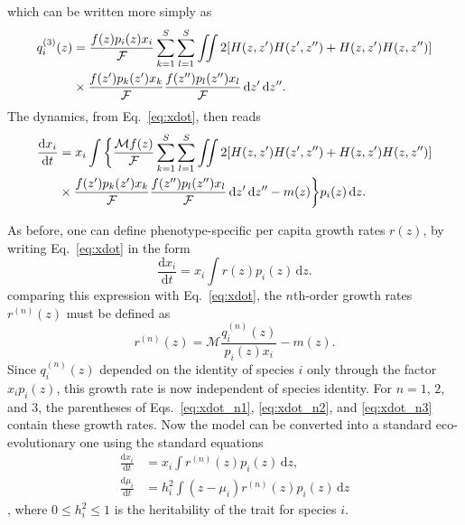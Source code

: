 \documentclass[11pt]{article}
\newcommand{\ud}{\text{d}}
\let\originalleft\left
\let\originalright\right
\renewcommand{\left}{\mathopen{}\mathclose\bgroup\originalleft}
\renewcommand{\right}{\aftergroup\egroup\originalright}
\begin{document}
which can be written more simply as
\begin{equation}
  \label{eq:qiz_n3}
  \begin{split}
    q_i^{(3)}(z) &= \frac{f(z) p_i(z) x_i}{\mathcal{F}} \sum_{k=1}^S \sum_{l=1}^S
    \iint 2 \left[ H(z,z')H(z',z'') + H(z,z')H(z,z'') \right] \\ &\times
    \frac{f(z') p_k(z') x_k}{\mathcal{F}} \frac{f(z'') p_l(z'') x_l}{\mathcal{F}}
    \,\ud z' \,\ud z'' .
  \end{split}
\end{equation}
The dynamics, from Eq.~\ref{eq:xdot}, then reads
\begin{equation}
  \label{eq:xdot_n3}
  \begin{split}
    \frac{\ud x_i}{\ud t} &= x_i \int\bigg\{\frac{\mathcal{M} f(z)}{\mathcal{F}}
    \sum_{k=1}^S \sum_{l=1}^S \iint 2 \left[ H(z,z')H(z',z'') + H(z,z')H(z,z'')
    \right] \\ &\times \frac{f(z') p_k(z') x_k}{\mathcal{F}}
    \frac{f(z'') p_l(z'') x_l}{\mathcal{F}} \,\ud z' \,\ud z'' - m(z) \bigg\}
    p_i(z) \,\ud z .
  \end{split}
\end{equation}

As before, one can define phenotype-specific per capita growth rates $r(z)$, by writing Eq.~\ref{eq:xdot} in the form
\begin{equation}
  \label{eq:ri_def}
  \frac{\ud x_i}{\ud t} = x_i \int r(z) p_i(z) \,\ud z .
\end{equation}
comparing this expression with Eq.~\ref{eq:xdot}, the $n$th-order growth rates $r^{(n)}(z)$ must be defined as
\begin{equation}
  \label{eq:rz}
  r^{(n)}(z) = \mathcal{M} \frac{q_i^{(n)}(z)}{p_i(z) x_i} - m(z) .
\end{equation}
Since $q_i^{(n)}(z)$ depended on the identity of species $i$ only through the factor $x_i p_i(z)$, this growth rate is now independent of species identity. For $n=1$, $2$, and $3$, the parentheses of Eqs.~\ref{eq:xdot_n1}, \ref{eq:xdot_n2}, and \ref{eq:xdot_n3} contain these growth rates. Now the model can be converted into a standard eco-evolutionary one using the standard equations
\begin{align}
  \label{eq:n}
  \frac{\ud x_i}{\ud t} &= x_i \int r^{(n)}(z) p_i(z) \,\ud z , \\
  \label{eq:m}
  \frac{\ud \mu_i}{\ud t} &= h_i^2 \int (z-\mu_i) r^{(n)}(z) p_i(z) \,\ud z
\end{align}
\cite{BarabasDAndrea2016}, where $0 \le h_i^2 \le 1$ is the heritability of the trait for species $i$.
\end{document}
